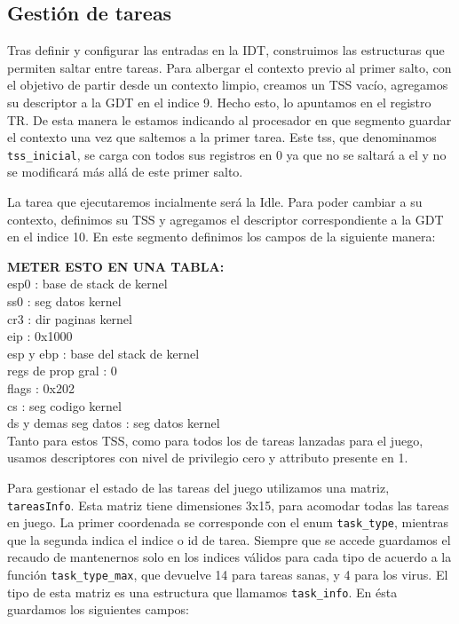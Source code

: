 \subsection{Gestión de tareas}

Tras definir y configurar las entradas en la IDT, construimos las estructuras que permiten saltar entre tareas.
Para albergar el contexto previo al primer salto, con el objetivo de partir desde un contexto limpio, creamos un TSS vacío, agregamos su descriptor a la GDT en el indice 9.
Hecho esto, lo apuntamos en el registro TR. De esta manera le estamos indicando al procesador en que segmento guardar el contexto una vez que saltemos a la primer tarea. 
Este tss, que denominamos \verb|tss_inicial|, se carga con todos sus registros en 0 ya que no se saltará a el y no se modificará más allá de este primer salto.

La tarea que ejecutaremos incialmente será la Idle. Para poder cambiar a su contexto, definimos su TSS y agregamos el descriptor correspondiente a la GDT en el indice 10.
En este segmento definimos los campos de la siguiente manera:

\textbf{METER ESTO EN UNA TABLA:}\\
esp0 : base de stack de kernel\\
ss0  : seg datos kernel\\
cr3  : dir paginas kernel\\
eip  : 0x1000\\
esp y ebp : base del stack de kernel\\
regs de prop gral : 0\\
flags : 0x202\\
cs : seg codigo kernel\\
ds y demas seg datos : seg datos kernel\\


Tanto para estos TSS, como para todos los de tareas lanzadas para el juego, usamos descriptores con nivel de privilegio cero y attributo presente en 1.\\\textbf{}


Para gestionar el estado de las tareas del juego utilizamos una matriz, \verb|tareasInfo|. Esta matriz tiene dimensiones 3x15, para acomodar todas las tareas en juego. La primer coordenada se corresponde con el enum \verb|task_type|, mientras que la segunda indica el indice o id de tarea. Siempre que se accede guardamos el recaudo de mantenernos solo en los indices válidos para cada tipo de acuerdo a la función \verb|task_type_max|, que devuelve 14 para tareas sanas, y 4 para los virus.
El tipo de esta matriz es una estructura que llamamos \verb|task_info|.
En ésta guardamos los siguientes campos:\\

